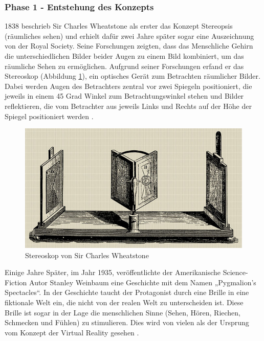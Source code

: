 \subsubsection{Phase 1 - Entstehung des Konzepts}
1838 beschrieb Sir Charles Wheatstone als erster das Konzept Stereopsis (räumliches sehen) und erhielt dafür zwei Jahre später sogar eine Auszeichnung von der Royal Society. Seine Forschungen zeigten, dass das Menschliche Gehirn die unterschiedlichen Bilder beider Augen zu einem Bild kombiniert, um das räumliche Sehen zu ermöglichen. Aufgrund seiner Forschungen erfand er das Stereoskop (Abbildung \ref{fig:Stereoskop}), ein optisches Gerät zum Betrachten räumlicher Bilder. Dabei werden Augen des Betrachters zentral vor zwei Spiegeln positioniert, die jeweils in einem 45 Grad Winkel zum Betrachtungswinkel stehen und Bilder reflektieren, die vom Betrachter aus jeweils Links und Rechts auf der Höhe der Spiegel positioniert werden \cite{20}.
\begin{figure}[h]
	\centering
	\includegraphics[width=0.5\linewidth]{Bilder/A13_Stereoskop}
	\caption{Stereoskop von Sir Charles Wheatstone \cite{20}}
	\label{fig:Stereoskop}
\end{figure}
\newline
\noindent
Einige Jahre Später, im Jahr 1935, veröffentlichte der Amerikanische Science-Fiction Autor Stanley Weinbaum eine Geschichte mit dem Namen „Pygmalion’s Spectacles“. In der Geschichte taucht der Protagonist durch eine Brille in eine fiktionale Welt ein, die nicht von der realen Welt zu unterscheiden ist. Diese Brille ist sogar in der Lage die menschlichen Sinne (Sehen, Hören, Riechen, Schmecken und Fühlen) zu stimulieren. Dies wird von vielen als der Ursprung vom Konzept der Virtual Reality gesehen \cite{20}.

